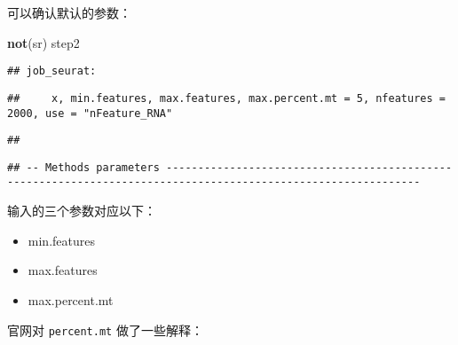 \documentclass[
]{article}
\newenvironment{Shaded}{\begin{snugshade}}{\end{snugshade}}
\newcommand{\KeywordTok}[1]{\textcolor[rgb]{0.13,0.29,0.53}{\textbf{#1}}}
\newcommand{\NormalTok}[1]{#1}
\providecommand{\tightlist}{%
  \setlength{\itemsep}{0pt}\setlength{\parskip}{0pt}}
\begin{document}
可以确认默认的参数：

\begin{Shaded}
\begin{Highlighting}[]
\KeywordTok{not}\NormalTok{(sr)}
\NormalTok{step2}
\end{Highlighting}
\end{Shaded}

\begin{verbatim}
## job_seurat:
\end{verbatim}

\begin{verbatim}
##     x, min.features, max.features, max.percent.mt = 5, nfeatures = 2000, use = "nFeature_RNA"
\end{verbatim}

\begin{verbatim}
## 
\end{verbatim}

\begin{verbatim}
## -- Methods parameters --------------------------------------------------------------------------------------------------------------
\end{verbatim}

输入的三个参数对应以下：

\begin{itemize}
\tightlist
\item
  min.features
\item
  max.features
\item
  max.percent.mt
\end{itemize}

官网对 \texttt{percent.mt} 做了一些解释：
\end{document}
